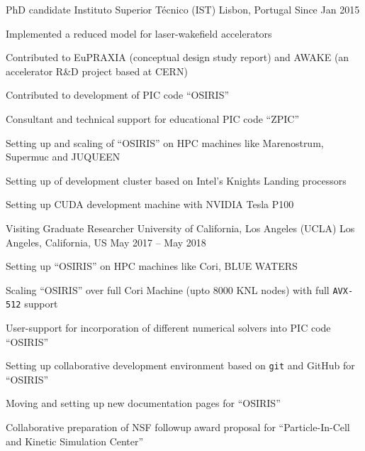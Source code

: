 \begin{cventries}
  \cventry
    {PhD candidate} %
    {Instituto Superior Técnico (IST)} %
    {Lisbon, Portugal} %
    {Since Jan 2015} %
    {
      \begin{cvitems} %
        \item Implemented a reduced model for laser-wakefield accelerators
        \item Contributed to EuPRAXIA (conceptual design study report) and AWAKE (an accelerator R\&D
        project based at CERN)
        \item Contributed to development of PIC code ``OSIRIS''
        \item Consultant and technical support for educational PIC code ``ZPIC''
        \item Setting up and scaling of ``OSIRIS'' on HPC machines like Marenostrum, Supermuc and JUQUEEN
        \item Setting up of development cluster based on Intel's Knights Landing processors
        \item Setting up CUDA development machine with NVIDIA Tesla P100
      \end{cvitems}
    }

  \cventry
    {Visiting Graduate Researcher} %
    {University of California, Los Angeles (UCLA)} %
    {Los Angeles, California, US} %
    {May 2017 -- May 2018} %
    {
      \begin{cvitems} %
        \item Setting up ``OSIRIS'' on HPC machines like Cori, BLUE WATERS
        \item Scaling ``OSIRIS'' over full Cori Machine (upto 8000 KNL nodes) with full \texttt{AVX-512} support
        \item User-support for incorporation of different numerical solvers into PIC code ``OSIRIS''
        \item Setting up collaborative development environment based on \texttt{git} and GitHub for ``OSIRIS''
        \item Moving and setting up new documentation pages for ``OSIRIS''
        \item Collaborative preparation of NSF followup award proposal for ``Particle-In-Cell and Kinetic Simulation Center''
      \end{cvitems}
    }


\end{cventries}
